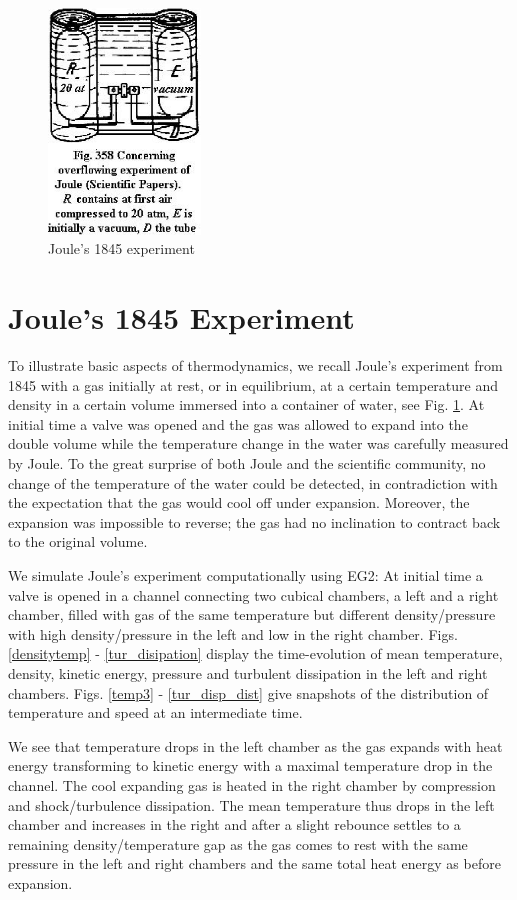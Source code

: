 \begin{figure}[bhpt] 
\centerline{ 
 \includegraphics[height=6cm]{chapters/hoffman-3/eps/fig358.eps} 
} 
\caption{Joule's 1845 experiment}
\label{joule} 
\end{figure} 


\section{Joule's 1845 Experiment} 

To illustrate basic aspects of thermodynamics, 
we recall Joule's experiment from 1845 with a gas initially
at rest, or in equilibrium, at a certain temperature and density  
in a certain volume immersed into a container of water, see
Fig. \ref{joule}. At initial time a valve was opened and the
gas was allowed to expand into the double volume while the temperature 
change in the water was carefully measured by Joule.
To the great surprise of both Joule and the scientific community, no change 
of the temperature of the water could be detected, in contradiction with 
the expectation that the gas would cool off under expansion. 
Moreover, the expansion was impossible to reverse; the gas had no inclination
to contract back to the original volume.  

We simulate Joule's experiment computationally using EG2: At initial time a
valve is opened in a channel connecting 
two cubical chambers, a left and a right chamber, filled with gas of the same
temperature but different 
density/pressure with high density/pressure in the left and low in the right
chamber. 
Figs. \ref{densitytemp} - \ref{tur_disipation} display the time-evolution of
mean temperature, density, kinetic 
energy, pressure and turbulent dissipation in the left and right chambers. Figs.
\ref{temp3} - \ref{tur_disp_dist} give snapshots of the distribution of 
temperature and speed at an intermediate time.

We see that temperature drops in the left chamber as the gas expands with heat
energy transforming to kinetic energy
with a maximal temperature drop in the channel. The cool expanding gas is
heated  in the right chamber by compression and shock/turbulence dissipation.
The mean temperature thus drops in the left chamber and
increases in the right and
after a slight rebounce settles to a remaining density/temperature gap as the
gas comes to rest with the same pressure
in the left and right chambers and the same total heat energy as before
expansion.

